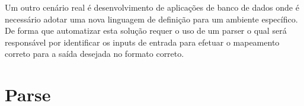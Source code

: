 Um outro cenário real é desenvolvimento de aplicações de banco de dados onde é necessário adotar uma nova linguagem de definição para um ambiente específico. De forma que automatizar esta solução requer o uso de um parser o qual será responsável por identificar os inputs de entrada para efetuar o mapeamento correto para a saída desejada no formato correto.




 

\section{Parse}

